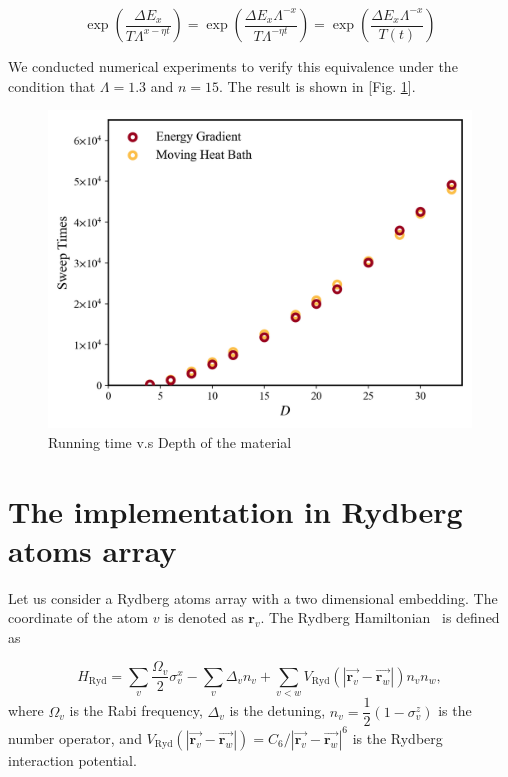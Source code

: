 \documentclass[twocolumn,superscriptaddress,english,showpacs,longbibliography]{revtex4-2}
\begin{document}
\begin{equation}
    \exp\left({\frac{\Delta E_x}{T\Lambda^{x-\eta t}}}\right) = \exp\left({\frac{\Delta E_x\Lambda^{-x}}{T\Lambda^{-\eta t}}}\right) = \exp\left({\frac{\Delta E_x \Lambda^{-x}}{T(t)}}\right)
\end{equation}

We conducted numerical experiments to verify this equivalence under the condition
that $\Lambda = 1.3$ and $n=15$. The result is shown in [Fig. \ref{EGvsMHB}].
\begin{figure}[h]
    \centering
    \includegraphics[width=\columnwidth,keepaspectratio]{../notes/images/EGvsMHB.png}
    \caption{Running time v.s Depth of the material}
    \label{EGvsMHB}
\end{figure}

\section{The implementation in Rydberg atoms array}\label{physical-model-rydberg-atoms-array}
Let us consider a Rydberg atoms array with a two dimensional embedding. The coordinate of the atom $v$ is denoted as $\mathbf{r}_v$.
The Rydberg Hamiltonian~\cite{Nguyen2023} is defined as

\begin{equation}
    H_{\text{Ryd}} = \sum_v \dfrac{\Omega_v}{2} \sigma^x_v -\sum_v \Delta_v n_v + \sum_{v < w}  V_{\text{Ryd}}(|\overrightarrow{\mathbf{r}_v} -\overrightarrow{\mathbf{r}_w}|)n_v n_w,
\end{equation}
where $\Omega_v$ is the Rabi frequency, $\Delta_v$ is the detuning,
$n_v = \dfrac{1}{2}(1 - \sigma^z_v)$ is the number operator, and
$V_{\text{Ryd}}(|\overrightarrow{\mathbf{r}_v} - \overrightarrow{\mathbf{r}_w}|) = C_6/|\overrightarrow{\mathbf{r}_v} - \overrightarrow{\mathbf{r}_w}|^6$
is the Rydberg interaction potential.
\end{document}
